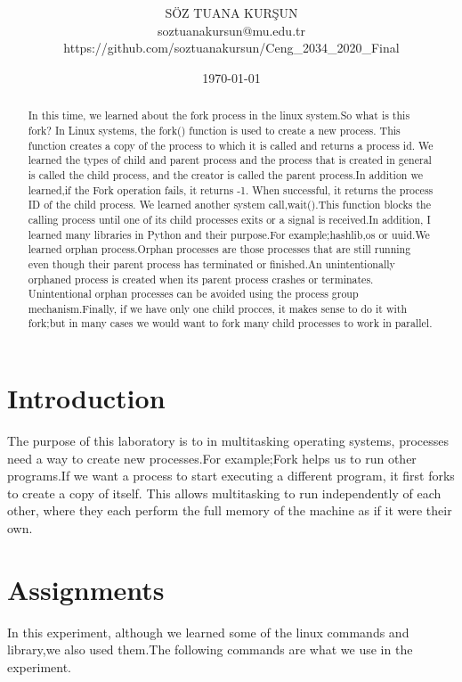 \documentclass[onecolumn]{article}
\title{\spacecaps{Assignment Report 2: FORK AND MULTIPROCESSING}\\ \normalsize \spacesc{CENG2034, Operating Systems} }
\author{SÖZ TUANA KURŞUN\\soztuanakursun@mu.edu.tr\\https://github.com/soztuanakursun/Ceng\_2034\_2020\_Final}
\date{\today}
\begin{document}
\maketitle

\begin{abstract}
In this time, we learned about the fork process in the linux system.So what is this fork? In Linux systems, the fork() function is used to create a new process. This function creates a copy of the process to which it is called and returns a process id. We learned the types of child and parent process and the process that is created in general is called the child process, and the creator is called the parent process.In addition we learned,if the Fork operation fails, it returns -1. When successful, it returns the process ID of the child process. We learned another system call,wait().This function blocks the calling process until one of its child processes exits or a signal is received.In addition, I learned many libraries in Python and their purpose.For example;hashlib,os or uuid.We learned orphan process.Orphan processes are those processes that are still running even though their parent process has terminated or finished.An unintentionally orphaned process is created when its parent process crashes or terminates. Unintentional orphan processes can be avoided using the process group mechanism.Finally, if we have only one child procces, it makes sense to do it with fork;but in many cases we would want to fork many child processes to work in parallel.
\end{abstract}


\section{Introduction}
The purpose of this laboratory is to in multitasking operating systems, processes need a way to create new processes.For example;Fork helps us to run other programs.If we want a process to start executing a different program, it first forks to create a copy of itself. This allows multitasking to run independently of each other, where they each perform the full memory of the machine as if it were their own.
\section{Assignments}
In this experiment, although we learned some of the linux commands and library,we also used them.The following commands are what we use in the experiment.
\end{document}
